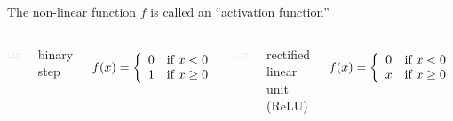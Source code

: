 \documentclass[aspectratio=169]{beamer}
\begin{document}
\begin{frame}{The non-linear function $f$ is called an ``activation function''}
\small
\vspace{0.5cm}
\begin{columns}
\includegraphics[width=\linewidth]{Activation_binary_step.pdf}

binary step

\vspace{-\baselineskip}
\[ f(x) = \left\{ \begin{array}{c l}
0 & \text{if } x < 0 \\
1 & \text{if } x \ge 0 \\
\end{array} \right. \]

\includegraphics[width=\linewidth]{Activation_rectified_linear.pdf}

rectified linear unit (ReLU)

\vspace{-\baselineskip}
\[ f(x) = \left\{ \begin{array}{c l}
0 & \text{if } x < 0 \\
x & \text{if } x \ge 0 \\
\end{array} \right. \]
\end{columns}


\end{frame}
\end{document}
